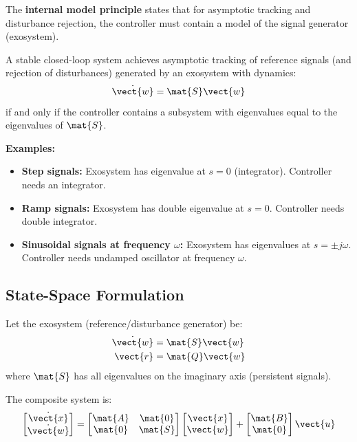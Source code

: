 The \textbf{internal model principle} states that for asymptotic tracking and disturbance rejection, the controller must contain a model of the signal generator (exosystem).

\begin{theorem}
A stable closed-loop system achieves asymptotic tracking of reference signals (and rejection of disturbances) generated by an exosystem with dynamics:
\begin{equation}
\dot{\vect{w}} = \mat{S}\vect{w}
\end{equation}
if and only if the controller contains a subsystem with eigenvalues equal to the eigenvalues of $\mat{S}$.
\end{theorem}

\textbf{Examples:}
\begin{itemize}
    \item \textbf{Step signals:} Exosystem has eigenvalue at $s = 0$ (integrator). Controller needs an integrator.
    \item \textbf{Ramp signals:} Exosystem has double eigenvalue at $s = 0$. Controller needs double integrator.
    \item \textbf{Sinusoidal signals at frequency $\omega$:} Exosystem has eigenvalues at $s = \pm j\omega$. Controller needs undamped oscillator at frequency $\omega$.
\end{itemize}

\subsection{State-Space Formulation}

Let the exosystem (reference/disturbance generator) be:
\begin{align}
\dot{\vect{w}} &= \mat{S}\vect{w} \\
\vect{r} &= \mat{Q}\vect{w}
\end{align}
where $\mat{S}$ has all eigenvalues on the imaginary axis (persistent signals).

The composite system is:
\begin{equation}
\begin{bmatrix} \dot{\vect{x}} \\ \dot{\vect{w}} \end{bmatrix} =
\begin{bmatrix} \mat{A} & \mat{0} \\ \mat{0} & \mat{S} \end{bmatrix}
\begin{bmatrix} \vect{x} \\ \vect{w} \end{bmatrix} +
\begin{bmatrix} \mat{B} \\ \mat{0} \end{bmatrix} \vect{u}
\end{equation}

